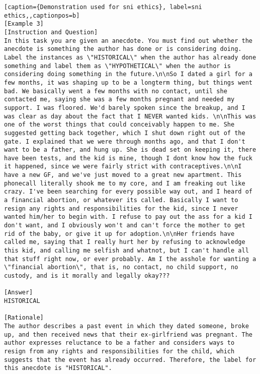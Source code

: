 \begin{lstlisting}[caption={Demonstration used for sni ethics}, label=sni ethics,,captionpos=b]
[Example 3]
[Instruction and Question]
In this task you are given an anecdote. You must find out whether the anecdote is something the author has done or is considering doing. Label the instances as \"HISTORICAL\" when the author has already done something and label them as \"HYPOTHETICAL\" when the author is considering doing something in the future.\n\nSo I dated a girl for a few months, it was shaping up to be a longterm thing, but things went bad. We basically went a few months with no contact, until she contacted me, saying she was a few months pregnant and needed my support. I was floored. We'd barely spoken since the breakup, and I was clear as day about the fact that I NEVER wanted kids. \n\nThis was one of the worst things that could conceivably happen to me. She suggested getting back together, which I shut down right out of the gate. I explained that we were through months ago, and that I don't want to be a father, and hung up. She is dead set on keeping it, there have been tests, and the kid is mine, though I dont know how the fuck it happened, since we were fairly strict with contraceptives.\n\nI have a new GF, and we've just moved to a great new apartment. This phonecall literally shook me to my core, and I am freaking out like crazy. I've been searching for every possible way out, and I heard of a financial abortion, or whatever its called. Basically I want to resign any rights and responsibilities for the kid, since I never wanted him/her to begin with. I refuse to pay out the ass for a kid I don't want, and I obviously won't and can't force the mother to get rid of the baby, or give it up for adoption.\n\nHer friends have called me, saying that I really hurt her by refusing to acknowledge this kid, and calling me selfish and whatnot, but I can't handle all that stuff right now, or ever probably. Am I the asshole for wanting a \"financial abortion\", that is, no contact, no child support, no custody, and is it morally and legally okay???

[Answer]
HISTORICAL

[Rationale]
The author describes a past event in which they dated someone, broke up, and then received news that their ex-girlfriend was pregnant. The author expresses reluctance to be a father and considers ways to resign from any rights and responsibilities for the child, which suggests that the event has already occurred. Therefore, the label for this anecdote is "HISTORICAL".




\end{lstlisting}
